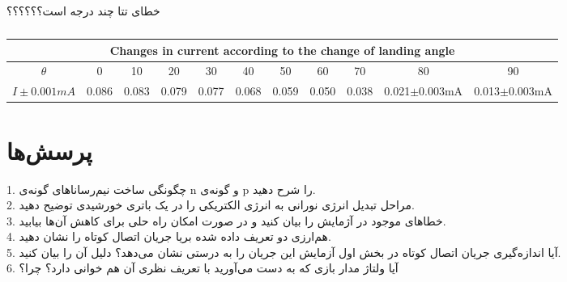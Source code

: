 \documentclass{article}
\begin{document}
	
	خطای تتا چند درجه است؟؟؟؟؟؟
	
	
	
	
	\begin{latin}
		\vspace{3cm}
		\begin{center}
			\begin{table}[h!]
				\centering
				
				\setlength{\tabcolsep}{8pt}
				\renewcommand{\arraystretch}{2}
				
				\begin{tabular}{|c|c|c|c|c|c|c|c|c|c|c|}
					\hline
					\multicolumn{11}{|c|}{Changes in current according to the change of landing angle} \\
					\hline
					$\theta$&0&10&20&30&40&50&60&70&80&90\\
					\hline
					$I\pm0.001mA$&0.086&0.083&0.079&0.077&0.068&0.059&0.050&0.038&0.021$\pm$0.003mA&0.013$\pm$0.003mA\\
					\hline
				\end{tabular}
				\caption{}
			\end{table}
		\end{center}
	\end{latin}
	\newpage
	
\section{پرسش‌ها}
1. چگونگی ساخت نیم‌رسانا‌های گونه‌ی n و گونه‌ی p را شرح دهید.\\
2. مراحل تبدیل انرژی نورانی به انرژی الکتریکی را در یک باتری خورشیدی توضیح دهید.\\
3. خطاهای موجود در آژمایش را بیان کنید و در صورت امکان راه حلی برای کاهش آن‌ها بیابید.\\
4. هم‌ارزی دو تعریف داده شده بریا جریان اتصال کوتاه را نشان دهید.\\
5. آیا اندازه‌گیری جریان اتصال کوتاه در بخش اول آزمایش این جریان را به درستی نشان می‌دهد؟ دلیل آن را بیان کنید.\\
6. آیا ولتاژ مدار بازی که به دست می‌آورید با تعریف نظری آن هم خوانی دارد؟ چرا؟\\
	
	
	
	
	
	
	
	
	
	
	
\end{document}
